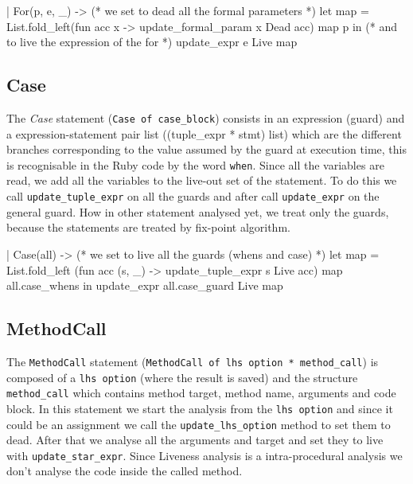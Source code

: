 \documentclass[a4paper]{article}   %
\begin{document}
\begin{ocaml}
| For(p, e, _) -> 
    (* we set to dead all the formal parameters *)
    let map = List.fold_left(fun acc x -> 
        update_formal_param x Dead acc) map p in 
    (* and to live the expression of the for *)
    update_expr e Live map
\end{ocaml}

\subsection{Case}
The \emph{Case} statement (\texttt{Case of case\_block}) consists in an expression (guard) and a expression-statement pair list ((tuple\_expr * stmt) list) which are the different branches corresponding to the value assumed by the guard at execution time, this is recognisable in the Ruby code by the word \texttt{when}. 
Since all the variables are read, we add all the variables to the live-out set of the statement. To do this we call \texttt{update\_tuple\_expr} on all the guards and after call \texttt{update\_expr} on the general guard.
How in other statement analysed yet, we treat only the guards, because the statements are treated by fix-point algorithm.

\begin{ocaml}
| Case(all) -> 
    (* we set to live all the guards (whens and case) *)
    let map = List.fold_left (fun acc (s, _) -> 
        update_tuple_expr s Live acc) map all.case_whens in
    update_expr all.case_guard Live map
\end{ocaml}

\subsection{MethodCall}

The \texttt{MethodCall} statement (\texttt{MethodCall of lhs option * method\_call}) is composed of a \texttt{lhs option} (where the result is saved) and the structure \texttt{method\_call} which contains method target, method name, arguments and code block.
%
In this statement we start the analysis from the \texttt{lhs option} and since it could be an assignment we call the \texttt{update\_lhs\_option} method to set them to dead.
After that we analyse all the arguments and target and set they to live with \texttt{update\_star\_expr}.
Since Liveness analysis is a intra-procedural analysis we don't analyse the code inside the called method.
\end{document}
